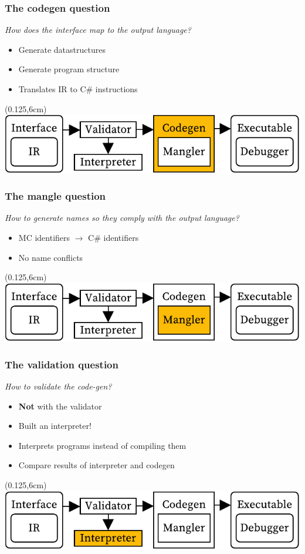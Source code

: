 \documentclass[xetex,serif,aspectratio=169]{beamer}
\begin{document}
\begin{frame}[t]
\end{frame}\begin{frame}[t]\frametitle{The codegen question}
\textit{How does the interface map to the output language?}
\begin{itemize}
    \item Generate datastructures
    \item Generate program structure
    \item Translates IR to C\# instructions
\end{itemize}
\begin{textblock*}{0.75\paperwidth}(0.125\paperwidth,6cm)\includegraphics[width=0.75\paperwidth]{overview_codegen}\end{textblock*}

\end{frame}\begin{frame}[t]\frametitle{The mangle question}
\textit{How to generate names so they comply with the output language?}
\begin{itemize}
    \item MC identifiers $\longrightarrow$ C\# identifiers
    \item No name conflicts
\end{itemize}
\begin{textblock*}{0.75\paperwidth}(0.125\paperwidth,6cm)\includegraphics[width=0.75\paperwidth]{overview_mangler}\end{textblock*}

\end{frame}\begin{frame}[t]\frametitle{The validation question}
\textit{How to validate the code-gen?}
\begin{itemize}
    \item \textbf{Not} with the validator
    \item Built an interpreter!
    \item Interprets programs instead of compiling them
    \item Compare results of interpreter and codegen
\end{itemize}
\begin{textblock*}{0.75\paperwidth}(0.125\paperwidth,6cm)\includegraphics[width=0.75\paperwidth]{overview_validation}\end{textblock*}


\end{frame}
\end{document}
